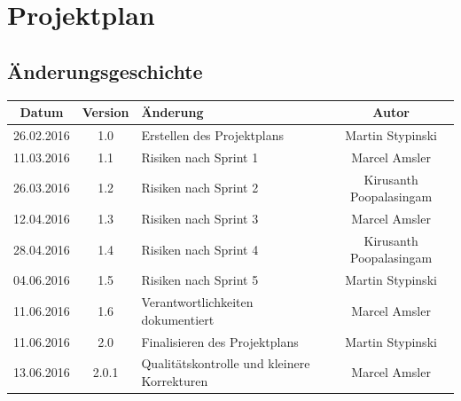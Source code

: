 
\newcommand{\greenbox}{
\begin{tikzpicture}
\draw[line width=0pt, fill=boxgreen]
(0, 0) rectangle (0.3, 0.3);
\end{tikzpicture}}

\newcommand{\orangebox}{
\begin{tikzpicture}
\draw[line width=0pt, fill=boxorange]
(0, 0) rectangle (0.3, 0.3);
\end{tikzpicture}}

\newcommand{\redbox}{
\begin{tikzpicture}
\draw[line width=0pt, fill=boxred]
(0, 0) rectangle (0.3, 0.3);
\end{tikzpicture}}

\chapter{Projektplan}
\section{Änderungsgeschichte}
\begin{tabularx}{\textwidth}{|c|c|X|c|}
  \hline
  \textbf{Datum} & \textbf{Version} & \textbf{Änderung} & \textbf{Autor} \\
  \hline \hline
  26.02.2016 & 1.0 & Erstellen des Projektplans & Martin Stypinski \\
  11.03.2016 & 1.1 & Risiken nach Sprint 1 & Marcel Amsler \\
  26.03.2016 & 1.2 & Risiken nach Sprint 2 & Kirusanth Poopalasingam \\
  12.04.2016 & 1.3 & Risiken nach Sprint 3 & Marcel Amsler \\
  28.04.2016 & 1.4 & Risiken nach Sprint 4 & Kirusanth Poopalasingam \\
  04.06.2016 & 1.5 & Risiken nach Sprint 5 & Martin Stypinski \\
  11.06.2016 & 1.6 & Verantwortlichkeiten dokumentiert & Marcel Amsler \\
  11.06.2016 & 2.0 & Finalisieren des Projektplans & Martin Stypinski \\
  13.06.2016 & 2.0.1 & Qualitätskontrolle und kleinere Korrekturen& Marcel Amsler\\
  \hline
\end{tabularx}

